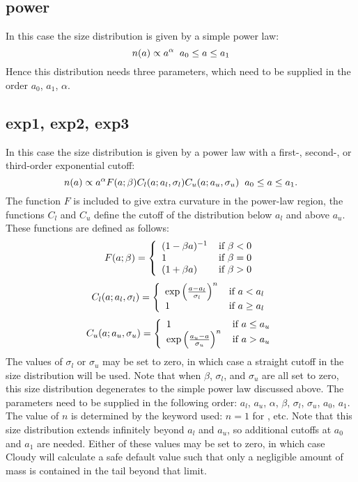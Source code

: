 \subsection{power}
In this case the size distribution is given by a simple power law:
\[ n(a) \propto a^\alpha \hspace{2mm} a_0 \leq a \leq a_1 \]
Hence this distribution needs three parameters, which need to be supplied
in the order $a_0$, $a_1$, $\alpha$.

\subsection{exp1, exp2, exp3}
In this case the size distribution is given by a power law with a first-,
second-, or third-order exponential cutoff:
\[ n(a) \propto a^\alpha F(a;\beta) C_l(a;a_l,\sigma_l) C_u(a;a_u,\sigma_u)
\hspace{2mm} a_0 \leq a \leq a_1. \] The function $F$ is included to give
extra curvature in the power-law region, the functions $C_l$ and $C_u$ define
the cutoff of the distribution below $a_l$ and above $a_u$. These functions
are defined as follows:
\[ F(a;\beta) = \left\{
	\begin{array}{l@{\hspace*{4mm}}l}
	    (1 - \beta a)^{-1} & \mbox{if } \beta < 0 \\
	     1 & \mbox{if } \beta = 0 \\
	    (1 + \beta a)      & \mbox{if } \beta > 0
        \end{array}
    \right.
\]
\[ C_l(a;a_l,\sigma_l) = \left\{
        \begin{array}{l@{\hspace*{4mm}}l}
	    \exp\left( \frac{a - a_l}{\sigma_l} \right)^n & \mbox{if } a < a_l \\
	    1 & \mbox{if } a \geq a_l
        \end{array}
     \right.
\]
\[ C_u(a;a_u,\sigma_u) = \left\{
        \begin{array}{l@{\hspace*{4mm}}l}
	    1 & \mbox{if } a \leq a_u \\
	    \exp\left( \frac{a_u - a}{\sigma_u} \right)^n & \mbox{if } a > a_u
        \end{array}
     \right.
\]
The values of $\sigma_l$ or $\sigma_u$ may be set to zero, in which case a
straight cutoff in the size distribution will be used. Note that when $\beta$,
$\sigma_l$, and $\sigma_u$ are all set to zero, this size distribution
degenerates to the simple power law discussed above. The parameters need to be
supplied in the following order: $a_l$, $a_u$, $\alpha$, $\beta$, $\sigma_l$,
$\sigma_u$, $a_0$, $a_1$. The value of $n$ is determined by the keyword used:
$n=1$ for , etc. Note that this size distribution extends
infinitely beyond $a_l$ and $a_u$, so additional cutoffs at $a_0$ and $a_1$
are needed. Either of these values may be set to zero, in which case Cloudy
will calculate a safe default value such that only a negligible amount of mass
is contained in the tail beyond that limit.
